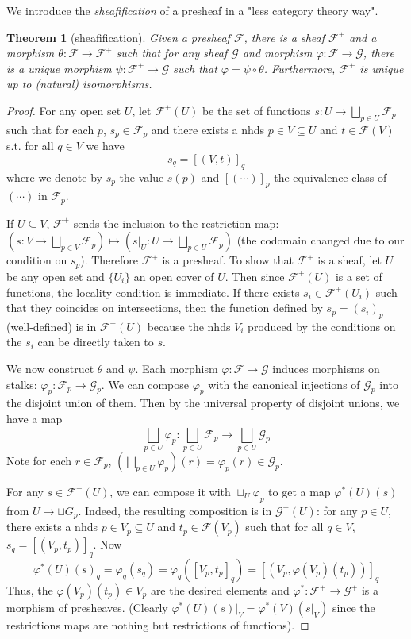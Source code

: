 \documentclass[12pt]{article}
\newtheorem{theorem}{Theorem}[subsection]
\theoremstyle{remark}
\begin{document}
	We introduce the \textit{sheafification} of a presheaf in a "less category theory way".
	\begin{theorem}[sheafification]\label{t121}
	Given a presheaf $\mathscr F$, there is a sheaf $\mathscr F^+$ and a morphism $\theta: \mathscr F\to \mathscr F^+$ such that for any sheaf $\mathscr G$ and morphism $\varphi:\mathscr F\to\mathscr G$, there is a unique morphism $\psi:\mathscr F^+\to \mathscr G$ such that $\varphi=\psi\circ\theta$. Furthermore, $\mathscr F^+$ is unique up to (natural) isomorphisms. 
	\end{theorem}
	\begin{proof}
	For any open set $U$, let $\mathscr F^+(U)$ be the set of functions $s:U\to \bigsqcup_{p\in U}\mathscr F_p$ such that for each $p$, $s_p\in \mathscr F_p$ and there exists a nhds $p\in V\subseteq U$ and $t\in\mathscr F(V)$ s.t. for all $q\in V$ we have
	\[s_q=[(V, t)]_q\]
	where we denote by $s_p$ the value $s(p)$ and $[(\cdots)]_p$ the equivalence class of $(\cdots)$ in $\mathscr F_p$.
	
	If $U\subseteq V$, $\mathscr F^+$ sends the inclusion to the restriction map: $(s:V\to \bigsqcup_{p\in V}\mathscr F_p)\mapsto (s|_U:U\to \bigsqcup_{p\in U}\mathscr F_p)$ (the codomain changed due to our condition on $s_p$). Therefore $\mathscr F^+$ is a presheaf. To show that $\mathscr F^+$ is a sheaf, let $U$ be any open set and $\{U_i\}$ an open cover of $U$. Then since $\mathscr F^+(U)$ is a set of functions, the locality condition is immediate. If there exists $s_i\in \mathscr F^+(U_i)$ such that they coincides on intersections, then the function defined by $s_p=(s_{i})_p$ (well-defined) is in $\mathscr F^+(U)$ because the nhds $V_i$ produced by the conditions on the $s_i$ can be directly taken to $s$.
	
	We now construct $\theta$ and $\psi$. Each morphism $\varphi: \mathscr F\to \mathscr G$ induces morphisms on stalks: $\varphi_p:\mathscr F_p\to \mathscr G_p$. We can compose $\varphi_p$ with the canonical injections of $\mathscr G_p$ into the disjoint union of them. Then by the universal property of disjoint unions, we have a map 
	\[\bigsqcup_{p\in U}\varphi_p:\bigsqcup_{p\in U}\mathscr F_p\to \bigsqcup_{p\in U}\mathscr G_p\]
	Note for each $r\in \mathscr F_p$, $\left(\bigsqcup_{p\in U}\varphi_p\right)(r)=\varphi_p(r)\in\mathscr G_p$.

	For any $s\in\mathscr F^+(U)$, we can compose it with $\sqcup_U\varphi_p$ to get a map $\varphi^*(U)(s)$ from $U\to \sqcup G_p$. Indeed, the resulting composition is in $\mathscr G^+(U)$: for any $p\in U$, there exists a nhds $p\in V_p\subseteq U$ and $t_p\in\mathscr F(V_p)$ such that for all $q\in V$, $s_q=[(V_p,t_p)]_q$. Now 
	\[\varphi^*(U)(s)_q=\varphi_q(s_q)=\varphi_q([V_p, t_p]_q)=[(V_p, \varphi(V_p)(t_p))]_q\]
	Thus, the $\varphi(V_p)(t_p)\in V_p$ are the desired elements and $\varphi^*:\mathscr F^+\to\mathscr G^+$ is a morphism of presheaves. (Clearly $\varphi^*(U)(s)|_V=\varphi^*(V)(s|_V)$ since the restrictions maps are nothing but restrictions of functions).
	

\end{proof}
\end{document}
